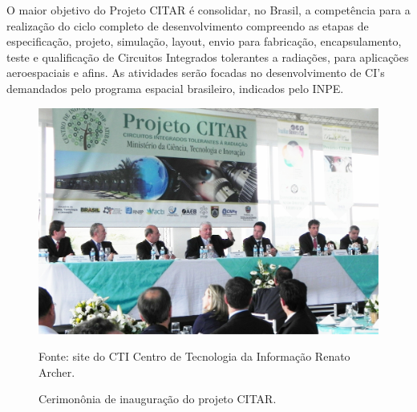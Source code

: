 O maior objetivo do Projeto CITAR é consolidar, no Brasil, a competência para a realização do ciclo completo de desenvolvimento compreendo as etapas de especificação, projeto, simulação, layout, envio para fabricação, encapsulamento, teste e qualificação de Circuitos Integrados tolerantes a radiações, para aplicações aeroespaciais e afins. As atividades serão focadas no desenvolvimento de CI's demandados pelo programa espacial brasileiro, indicados pelo INPE.\cite{CTIinaugura:Online}



\vfill
\begin{figure}[!htb]
	\centering
	\caption{Cerimonônia de inauguração do projeto CITAR.}
	\includegraphics[scale = 0.5]{imagens/inauguracaoCTI.jpg}
	
	Fonte: site do CTI Centro de Tecnologia da Informação Renato Archer.\footnotemark[2]
	
	\label{Cerimonia}
\end{figure}
\vfill

\let\thefootnote\relax{}



